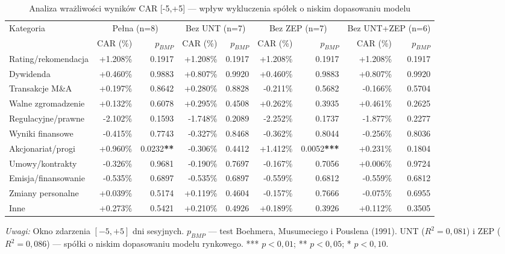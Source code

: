 \begin{table}[htbp]
\centering\footnotesize
\caption{Analiza wrażliwości wyników CAR [-5,+5] — wpływ wykluczenia spółek o niskim dopasowaniu modelu}
\label{tab:sensitivity}
\begin{tabular}{lrrrrrrrr}
\toprule
Kategoria & \multicolumn{2}{c}{Pełna (n=8)} & \multicolumn{2}{c}{Bez UNT (n=7)} & \multicolumn{2}{c}{Bez ZEP (n=7)} & \multicolumn{2}{c}{Bez UNT+ZEP (n=6)} \\
\cmidrule(lr){2-3}\cmidrule(lr){4-5}\cmidrule(lr){6-7}\cmidrule(lr){8-9}
 & CAR (\%) & $p_{BMP}$ & CAR (\%) & $p_{BMP}$ & CAR (\%) & $p_{BMP}$ & CAR (\%) & $p_{BMP}$ \\
\midrule
Rating/rekomendacja & +1.208\% & 0.1917 & +1.208\% & 0.1917 & +1.208\% & 0.1917 & +1.208\% & 0.1917 \\
Dywidenda & +0.460\% & 0.9883 & +0.807\% & 0.9920 & +0.460\% & 0.9883 & +0.807\% & 0.9920 \\
Transakcje M\&A & +0.197\% & 0.8642 & +0.280\% & 0.8828 & -0.211\% & 0.5682 & -0.166\% & 0.5704 \\
Walne zgromadzenie & +0.132\% & 0.6078 & +0.295\% & 0.4508 & +0.262\% & 0.3935 & +0.461\% & 0.2625 \\
Regulacyjne/prawne & -2.102\% & 0.1593 & -1.748\% & 0.2089 & -2.252\% & 0.1737 & -1.877\% & 0.2277 \\
Wyniki finansowe & -0.415\% & 0.7743 & -0.327\% & 0.8468 & -0.362\% & 0.8044 & -0.256\% & 0.8036 \\
Akcjonariat/progi & +0.960\% & 0.0232\textbf{**} & -0.306\% & 0.4412 & +1.412\% & 0.0052\textbf{***} & +0.231\% & 0.1804 \\
Umowy/kontrakty & -0.326\% & 0.9681 & -0.190\% & 0.7697 & -0.167\% & 0.7056 & +0.006\% & 0.9724 \\
Emisja/finansowanie & -0.535\% & 0.6897 & -0.535\% & 0.6897 & -0.559\% & 0.6812 & -0.559\% & 0.6812 \\
Zmiany personalne & +0.039\% & 0.5174 & +0.119\% & 0.4604 & -0.157\% & 0.7666 & -0.075\% & 0.6955 \\
Inne & +0.273\% & 0.5421 & +0.210\% & 0.4926 & +0.189\% & 0.3926 & +0.112\% & 0.3505 \\
\bottomrule
\end{tabular}
\begin{tablenotes}
\small \item \textit{Uwagi:} Okno zdarzenia $[-5,+5]$ dni sesyjnych. $p_{BMP}$ — test Boehmera, Musumeciego i Pouslena (1991). UNT ($R^2=0{,}081$) i ZEP ($R^2=0{,}086$) — spółki o niskim dopasowaniu modelu rynkowego. *** $p<0{,}01$; ** $p<0{,}05$; * $p<0{,}10$.
\end{tablenotes}
\end{table}
